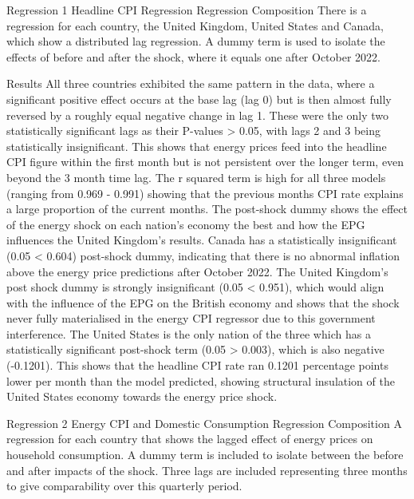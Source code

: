 Regression 1 Headline CPI Regression
Regression Composition
There is a regression for each country, the United Kingdom, United States and Canada, which show a distributed lag regression.
A dummy term is used to isolate the effects of before and after the shock, where it equals one after October 2022.

Results
All three countries exhibited the same pattern in the data, where a significant positive effect occurs at the base lag (lag 0) but is then almost fully reversed by a roughly equal negative change in lag 1. These were the only two statistically significant lags as their P-values > 0.05, with lags 2 and 3 being statistically insignificant. This shows that energy prices feed into the headline CPI figure within the first month but is not persistent over the longer term, even beyond the 3 month time lag. 
The r squared term is high for all three models (ranging from 0.969 - 0.991) showing that the previous months CPI rate explains a large proportion of the current months.
The post-shock dummy shows the effect of the energy shock on each nation's economy the best and how the EPG influences the United Kingdom's results. Canada has a statistically insignificant (0.05 < 0.604) post-shock dummy, indicating that there is no abnormal inflation above the energy price predictions after October 2022.
The United Kingdom's post shock dummy is strongly insignificant (0.05 < 0.951), which would align with the influence of the EPG on the British economy and shows that the shock never fully materialised in the energy CPI regressor due to this government interference.
The United States is the only nation of the three which has a statistically significant post-shock term (0.05 > 0.003), which is also negative (-0.1201). This shows that the headline CPI rate ran 0.1201 percentage points lower per month than the model predicted, showing structural insulation of the United States economy towards the energy price shock.


Regression 2 Energy CPI and Domestic Consumption
Regression Composition
A regression for each country that shows the lagged effect of energy prices on household consumption.
A dummy term is included to isolate between the before and after impacts of the shock.
Three lags are included representing three months to give comparability over this quarterly period.

